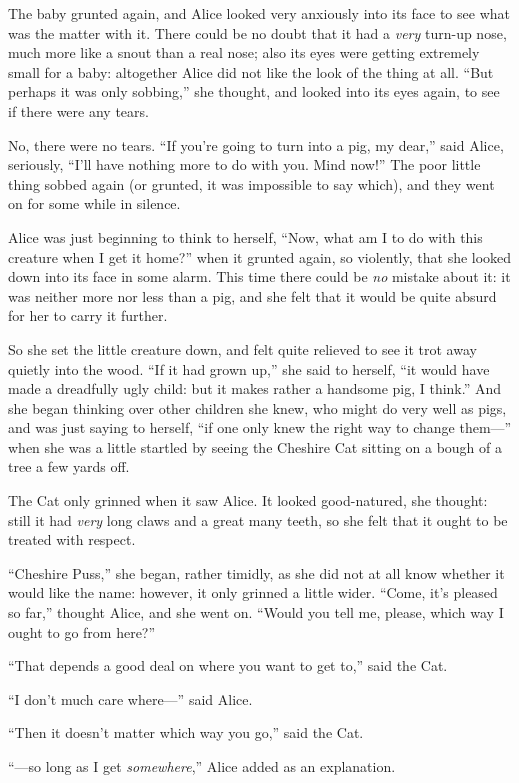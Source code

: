\documentclass[11pt,openany,oneside]{book}
\begin{document}
The baby grunted again, and Alice looked very anxiously into its face to see what was the matter with it. There could be no doubt that it had a {\em very\/} turn-up nose, much more like a snout than a real nose; also its eyes were getting extremely small for a baby: altogether Alice did not like the look of the thing at all. “But perhaps it was only sobbing,” she thought, and looked into its eyes again, to see if there were any tears. 

No, there were no tears. “If you’re going to turn into a pig, my dear,” said Alice, seriously, “I’ll have nothing more to do with you. Mind now!” The poor little thing sobbed again (or grunted, it was impossible to say which), and they went on for some while in silence. 

Alice was just beginning to think to herself, “Now, what am I to do with this creature when I get it home?” when it grunted again, so violently, that she looked down into its face in some alarm. This time there could be {\em no\/} mistake about it: it was neither more nor less than a pig, and she felt that it would be quite absurd for her to carry it further. 

So she set the little creature down, and felt quite relieved to see it trot away quietly into the wood. “If it had grown up,” she said to herself, “it would have made a dreadfully ugly child: but it makes rather a handsome pig, I think.” And she began thinking over other children she knew, who might do very well as pigs, and was just saying to herself, “if one only knew the right way to change them—” when she was a little startled by seeing the Cheshire Cat sitting on a bough of a tree a few yards off. 

The Cat only grinned when it saw Alice. It looked good-natured, she thought: still it had {\em very\/} long claws and a great many teeth, so she felt that it ought to be treated with respect. 

“Cheshire Puss,” she began, rather timidly, as she did not at all know whether it would like the name: however, it only grinned a little wider. “Come, it’s pleased so far,” thought Alice, and she went on. “Would you tell me, please, which way I ought to go from here?” 

“That depends a good deal on where you want to get to,” said the Cat. 

“I don’t much care where—” said Alice. 

“Then it doesn’t matter which way you go,” said the Cat. 

“—so long as I get {\em somewhere\/},” Alice added as an explanation. 
\end{document}
